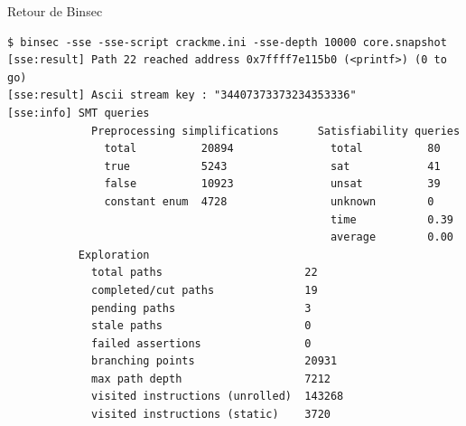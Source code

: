 \documentclass{backend/backend}
\begin{document}
\begin{frame}[fragile]{Retour de Binsec}
    \begin{verbatim}
$ binsec -sse -sse-script crackme.ini -sse-depth 10000 core.snapshot
[sse:result] Path 22 reached address 0x7ffff7e115b0 (<printf>) (0 to go)
[sse:result] Ascii stream key : "34407373373234353336"
[sse:info] SMT queries
             Preprocessing simplifications      Satisfiability queries
               total          20894               total          80
               true           5243                sat            41
               false          10923               unsat          39
               constant enum  4728                unknown        0
                                                  time           0.39
                                                  average        0.00
           Exploration
             total paths                      22
             completed/cut paths              19
             pending paths                    3
             stale paths                      0
             failed assertions                0
             branching points                 20931
             max path depth                   7212
             visited instructions (unrolled)  143268
             visited instructions (static)    3720
    \end{verbatim}

\end{frame}
\end{document}
